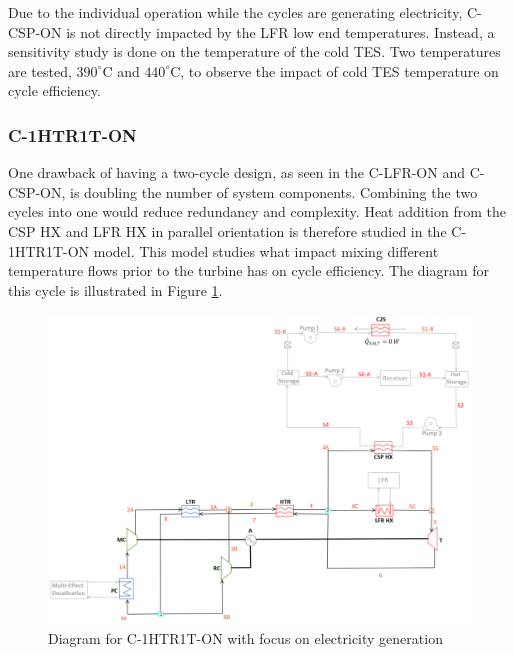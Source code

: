 \begin{paracol}{2}
\linenumbers
\switchcolumn

 Due to the individual operation while the cycles are generating electricity, C-CSP-ON is not directly impacted by the LFR low end temperatures. Instead, a sensitivity study is done on the temperature of the cold TES. Two temperatures are tested, $390^{\circ}$C and $440^{\circ}$C, to observe the impact of cold TES temperature on cycle efficiency. 


\subsubsection{C-1HTR1T-ON} 

One drawback of having a two-cycle design, as seen in the C-LFR-ON and C-CSP-ON, is doubling the number of system components. Combining the two cycles into one would reduce redundancy and complexity. Heat addition from the CSP HX and LFR HX in parallel orientation is therefore studied in the C-1HTR1T-ON model. This model studies what impact mixing different temperature flows prior to the turbine has on cycle efficiency. The diagram for this cycle is illustrated in Figure \ref{c-1htr1t-on}.

\end{paracol}

\begin{figure}[H] 
    \widefigure
    \includegraphics[width=\linewidth]{Definitions/c-1htr1t-on.pdf}
    \caption{Diagram for C-1HTR1T-ON with focus on electricity generation\label{c-1htr1t-on}}
\end{figure}


